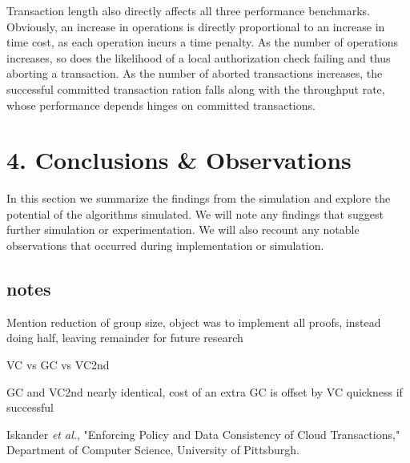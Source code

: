 \documentclass[11pt]{article}
\begin{document}
Transaction length also directly affects all three performance benchmarks. Obviously, an increase in operations is directly proportional to an increase in time cost, as each operation incurs a time penalty. As the number of operations increases, so does the likelihood of a local authorization check failing and thus aborting a transaction. As the number of aborted transactions increases, the successful committed transaction ration falls along with the throughput rate, whose performance depends hinges on committed transactions.
\section{4. Conclusions \& Observations}
In this section we summarize the findings from the simulation and explore the potential of the algorithms simulated. We will note any findings that suggest further simulation or experimentation. We will also recount any notable observations that occurred during implementation or simulation.
\subsection{notes}
Mention reduction of group size, object was to implement all proofs, instead doing half, leaving remainder for future research

VC vs GC vs VC2nd

GC and VC2nd nearly identical, cost of an extra GC is offset by VC quickness if successful
\begin{thebibliography}{9}
 Iskander \emph{et al.}, "Enforcing Policy and Data Consistency of Cloud Transactions," Department of Computer Science, University of Pittsburgh.
\end{thebibliography}
\end{document}
